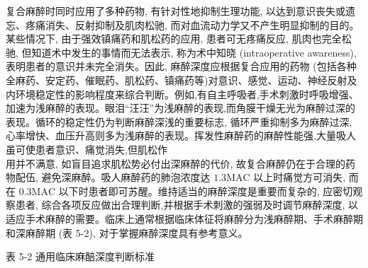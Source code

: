 \documentclass[10pt]{article}
\begin{document}
复合麻醉时同时应用了多种药物, 有针对性地抑制生理功能, 以达到意识丧失或遗忘、疼痛消失、反射抑制及肌肉松驰, 而对血流动力学又不产生明显抑制的目的。某些情况下, 由于强效镇痛药和肌松药的应用, 患者可无疼痛反应, 肌肉也完全松驰, 但知道术中发生的事情而无法表示, 称为术中知晓 (intraoperative awareness), 表明患者的意识并未完全消失。因此, 麻醉深度应根据复合应用的药物 (包括各种全麻药、安定药、催眠药、肌松药、镇痛药等)对意识、感觉、运动、神经反射及内环境稳定性的影响程度来综合判断。例如,有自主呼吸者,手术刺激时呼吸增强、加速为浅麻醉的表现。眼泪“汪汪”为浅麻醉的表现,而角膜干燥无光为麻醉过深的表现。循环的稳定性仍为判断麻醉深浅的重要标志, 循环严重抑制多为麻醉过深, 心率增快、血压升高则多为浅麻醉的表现。挥发性麻醉药的麻醉性能强,大量吸人虽可使患者意识、痛觉消失,但肌松作\\
用并不满意, 如盲目追求肌松势必付出深麻醉的代价, 故复合麻醉仍在于合理的药物配伍, 避免深麻醉。吸人麻醉药的肺泡浓度达 $1.3 \mathrm{MAC}$ 以上时痛觉方可消失, 而在 $0.3 \mathrm{MAC}$ 以下时患者即可苏醒。维持适当的麻醉深度是重要而复杂的, 应密切观察患者, 综合各项反应做出合理判断,并根据手术刺激的强弱及时调节麻醉深度, 以适应手术麻醉的需要。临床上通常根据临床体征将麻醉分为浅麻醉期、手术麻醉期和深麻醉期 (表 5-2), 对于掌握麻醉深度具有参考意义。

表 5-2 通用临床麻醅深度判断标准
\end{document}
